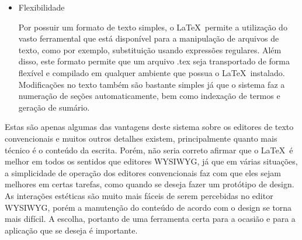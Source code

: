 \begin{itemize}
\item Flexibilidade

Por possuir um formato de texto simples, o \LaTeX\ permite a utilização do vasto ferramental que está disponível para a manipulação de arquivos de texto, como por exemplo, substituição usando expressões regulares. Além disso, este formato permite que um arquivo .tex seja transportado de forma flexível e compilado em qualquer ambiente que possua o \LaTeX\ instalado. Modificações no texto também são bastante simples já que o sistema faz a numeração de seções automaticamente, bem como indexação de termos e geração de sumário.

\end{itemize}

Estas são apenas algumas das vantagens deste sistema sobre os editores de texto convencionais e muitos outros detalhes existem, principalmente quanto mais técnico é o conteúdo da escrita. Porém, não seria correto afirmar que o \LaTeX\ é melhor em todos os sentidos que editores WYSIWYG, já que em várias situações, a simplicidade de operação dos editores convencionais faz com que eles sejam melhores em certas tarefas, como quando se deseja fazer um protótipo de design. As interações estéticas são muito mais fáceis de serem percebidas no editor WYSIWYG, porém a manutenção do conteúdo de acordo com o design se torna mais difícil. A escolha, portanto de uma ferramenta certa para a ocasião e para a aplicação que se deseja é importante.

